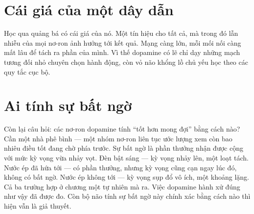 \section*{Cái giá của một dây dẫn}

Học qua quảng bá có cái giá của nó. Một tín hiệu cho tất cả, mà trong đó lẫn nhiễu của mọi nơ-ron ảnh hưởng tới kết quả. Mạng càng lớn, mỗi mối nối càng mất lâu để tách ra phần của mình. Vì thế dopamine có lẽ chỉ dạy những mạch tương đối nhỏ chuyên chọn hành động, còn vỏ não khổng lồ chủ yếu học theo các quy tắc cục bộ.

\section*{Ai tính sự bất ngờ}

Còn lại câu hỏi: các nơ-ron dopamine tính ``tốt hơn mong đợi'' bằng cách nào? Cần một nhà phê bình --- một nhóm nơ-ron liên tục ước lượng xem còn bao nhiêu điều tốt đang chờ phía trước. Sự bất ngờ là phần thưởng nhận được cộng với mức kỳ vọng vừa nhảy vọt. Đèn bật sáng --- kỳ vọng nhảy lên, một loạt tách. Nước ép đã hứa tới --- có phần thưởng, nhưng kỳ vọng cũng cạn ngay lúc đó, không có bất ngờ. Nước ép không tới --- kỳ vọng sụp đổ vô ích, một khoảng lặng. Cả ba trường hợp ở chương một tự nhiên mà ra. Việc dopamine hành xử đúng như vậy đã được đo. Còn bộ não tính sự bất ngờ này chính xác bằng cách nào thì hiện vẫn là giả thuyết.


